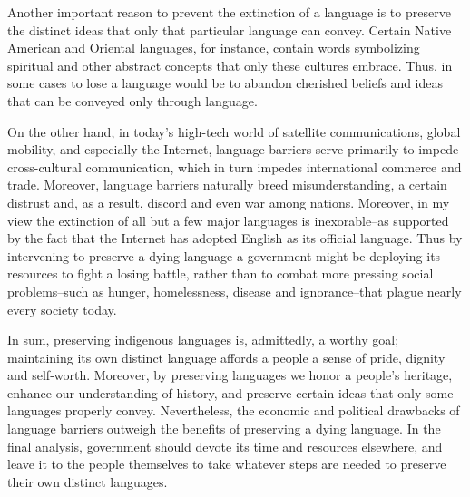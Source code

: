 Another important reason to prevent the extinction of a language is to preserve the distinct ideas that only that particular language can convey.
Certain Native American and Oriental languages, for instance, contain words symbolizing spiritual and other abstract concepts that only these cultures embrace.
Thus, in some cases to lose a language would be to abandon cherished beliefs and ideas that can be conveyed only through language.


On the other hand, in today's high-tech world of satellite communications, global mobility, and especially the Internet, language barriers serve primarily to impede cross-cultural communication, which in turn impedes international commerce and trade.
Moreover, language barriers naturally breed misunderstanding, a certain distrust and, as a result, discord and even war among nations.
Moreover, in my view the extinction of all but a few major languages is inexorable--as supported by the fact that the Internet has adopted English as its official language.
Thus by intervening to preserve a dying language a government might be deploying its resources to fight a losing battle, rather than to combat more pressing social problems--such as hunger, homelessness, disease and ignorance--that plague nearly every society today.


In sum, preserving indigenous languages is, admittedly, a worthy goal; maintaining its own distinct language affords a people a sense of pride, dignity and self-worth.
Moreover, by preserving languages we honor a people's heritage, enhance our understanding of history, and preserve certain ideas that only some languages properly convey.
Nevertheless, the economic and political drawbacks of language barriers outweigh the benefits of preserving a dying language.
In the final analysis, government should devote its time and resources elsewhere, and leave it to the people themselves to take whatever steps are needed to preserve their own distinct languages.
